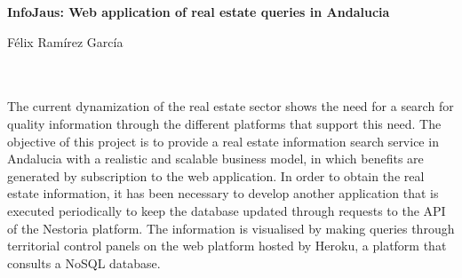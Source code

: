 \thispagestyle{empty}

\begin{center}
	{\large\bfseries InfoJaus: Web application of real estate queries in Andalucia}\\
\end{center}

\begin{center}
	Félix Ramírez García\\
\end{center}

\begin{flushleft}
	\\
	
	\vspace{0.7cm}
	\\
	The current dynamization of the real estate sector shows the need for a search for quality information through the different platforms that support this need.  
	The objective of this project is to provide a real estate information search service in Andalucia with a realistic and scalable business model, in which benefits are generated by subscription to the web application.
	In order to obtain the real estate information, it has been necessary to develop another application that is executed periodically to keep the database updated through requests to the API of the Nestoria platform.
	The information is visualised by making queries through territorial control panels on the web platform hosted by Heroku, a platform that consults a NoSQL database.
\end{flushleft}

\newpage %

